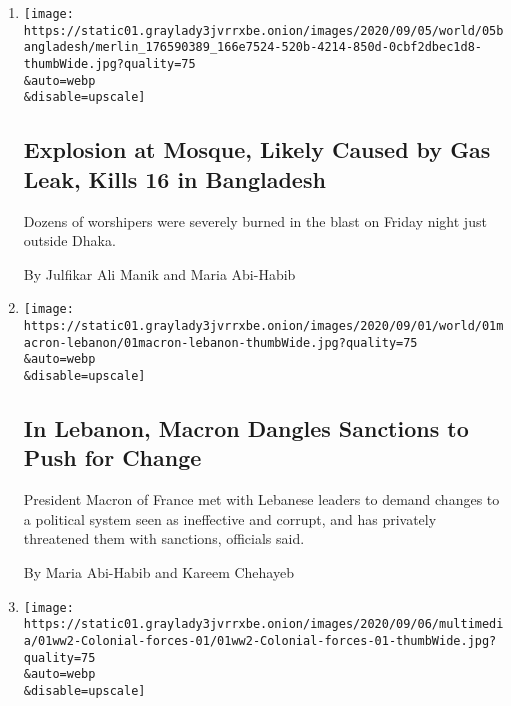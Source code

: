 \begin{enumerate}
\def\labelenumi{\arabic{enumi}.}
\item
  \href{/2020/09/05/world/asia/bangladesh-mosque-explosion.html}{}

  \texttt{[image: https://static01.graylady3jvrrxbe.onion/images/2020/09/05/world/05bangladesh/merlin\_176590389\_166e7524-520b-4214-850d-0cbf2dbec1d8-thumbWide.jpg?quality=75\\\&auto=webp\\\&disable=upscale]}

  \hypertarget{explosion-at-mosque-likely-caused-by-gas-leak-kills-16-in-bangladesh}{%
  \subsection{Explosion at Mosque, Likely Caused by Gas Leak, Kills 16
  in
  Bangladesh}\label{explosion-at-mosque-likely-caused-by-gas-leak-kills-16-in-bangladesh}}

  Dozens of worshipers were severely burned in the blast on Friday night
  just outside Dhaka.

  By Julfikar Ali Manik and Maria Abi-Habib
\item
  \href{/2020/09/01/world/middleeast/lebanon-macron-sanctions.html}{}

  \texttt{[image: https://static01.graylady3jvrrxbe.onion/images/2020/09/01/world/01macron-lebanon/01macron-lebanon-thumbWide.jpg?quality=75\\\&auto=webp\\\&disable=upscale]}

  \hypertarget{in-lebanon-macron-dangles-sanctions-to-push-for-change}{%
  \subsection{In Lebanon, Macron Dangles Sanctions to Push for
  Change}\label{in-lebanon-macron-dangles-sanctions-to-push-for-change}}

  President Macron of France met with Lebanese leaders to demand changes
  to a political system seen as ineffective and corrupt, and has
  privately threatened them with sanctions, officials said.

  By Maria Abi-Habib and Kareem Chehayeb
\item
  \href{/2020/09/01/magazine/the-forgotten-colonial-forces-of-world-war-ii.html}{}

  \texttt{[image: https://static01.graylady3jvrrxbe.onion/images/2020/09/06/multimedia/01ww2-Colonial-forces-01/01ww2-Colonial-forces-01-thumbWide.jpg?quality=75\\\&auto=webp\\\&disable=upscale]}

  \hypertarget{beyond-the-world-war-ii-we-know}{%
}
\end{enumerate}
